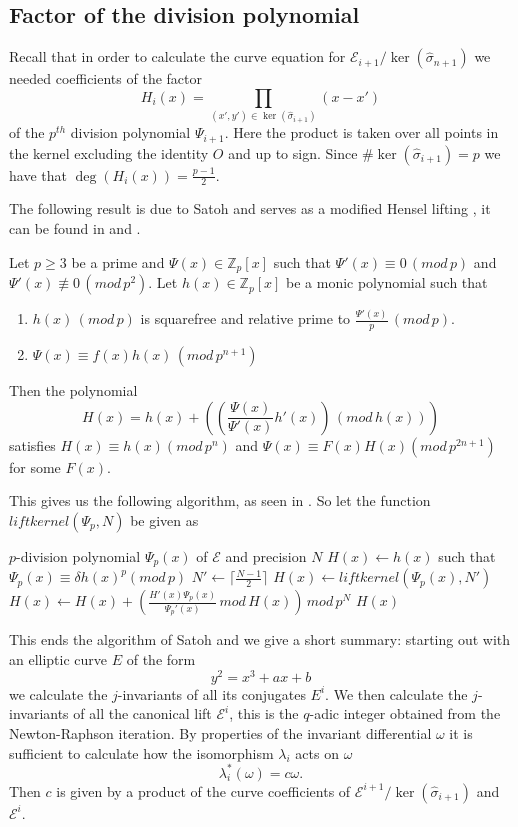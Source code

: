 \subsection{Factor of the division polynomial} \label{satohdiv}
Recall that in order to calculate the curve equation for $\mathscr{E}_{i+1}/\ker(\widehat{\sigma}_{n+1})$
we needed coefficients of the factor
$$H_i(x) = \prod_{(x',y')\in \ker(\widehat{\sigma}_{i+1})} (x-x')$$
of the $p^{th}$ division polynomial $\Psi_{i+1}$. Here the product is taken over all points in
the kernel excluding the identity $O$ and up to sign. Since $\#\ker(\widehat{\sigma}_{i+1}) = p$ we have
that $\deg(H_i(x)) = \frac{p-1}{2}$.

The following result is due to Satoh and serves as a modified Hensel lifting \cite{Robert}, it can be found
in \cite{Satoh} and \cite{Handbook}.
\begin{prop}
 Let $p\geq 3$ be a prime and $\Psi(x) \in \mathbb{Z}_p[x]$ such that $\Psi'(x) \equiv 0\, (mod\, p)$ and
$\Psi'(x) \not\equiv 0\, (mod\, p^2)$. Let $h(x) \in \mathbb{Z}_p[x]$ be a monic polynomial such that
\begin{enumerate}
  \item $h(x) \,(mod\,p)$ is squarefree and relative prime to $\frac{\Psi'(x)}{p}\,(mod\,p)$.
  \item $\Psi(x) \equiv f(x)h(x)\,(mod\,p^{n+1})$
\end{enumerate}
Then the polynomial
$$H(x) = h(x) + \left(\left(\frac{\Psi(x)}{\Psi'(x)} h'(x)\right)\,(mod\, h(x))\right)$$
satisfies $H(x) \equiv h(x) (mod\, p^n)$ and $\Psi(x) \equiv F(x)H(x) (mod \, p^{2n+1})$ for some $F(x)$.
\end{prop}
This gives us the following algorithm, as seen in \cite{Handbook}. So let the function
$liftkernel(\Psi_p, N)$ be given as
\begin{algorithmic}
\REQUIRE $p$-division polynomial $\Psi_p(x)$ of $\mathscr{E}$ and precision $N$
        \STATE $H(x)\gets h(x)$ such that $\Psi_p(x) \equiv \delta h(x)^p (mod\, p)$
\ELSE
        \STATE $N'\gets \lceil\frac{N-1}{2}\rceil$
	\STATE $H(x)\gets liftkernel(\Psi_p(x), N')$
	\STATE $H(x)\gets H(x) + \left(\frac{H'(x)\Psi_p(x)}{\Psi_p'(x)} \, mod\, H(x) \right)\, mod\, p^N$
\ENDIF
\RETURN $H(x)$
\end{algorithmic}
This ends the algorithm of Satoh and we give a short summary: starting out with
an elliptic curve $E$ of the form $$y^2 = x^3 + ax + b$$ we calculate the $j$-invariants of
all its conjugates $E^i$. We then calculate the $j$-invariants of all the canonical lift $\mathscr{E}^i$,
this is the $q$-adic integer obtained from the Newton-Raphson iteration. By properties of the
invariant differential $\omega$ it is sufficient to calculate how the isomorphism $\lambda_i$ acts on
$\omega$
$$\lambda_i^*(\omega) = c\omega.$$
Then $c$ is given by a product of the curve coefficients of
$\mathscr{E}^{i+1}/\ker(\widehat{\sigma}_{i+1})$ and $\mathscr{E}^i$.
